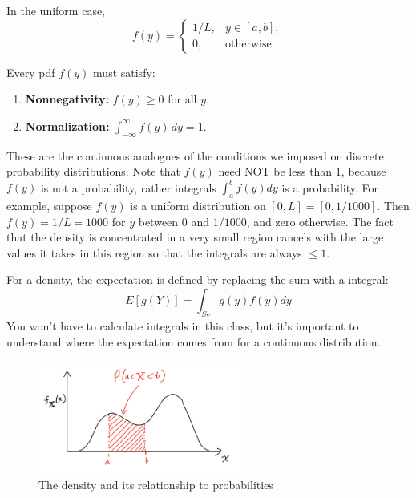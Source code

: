 In the uniform case,  
\[
f(y) = 
\begin{cases}
1/L, & y \in [a,b], \\
0, & \text{otherwise}.
\end{cases}
\]  

Every pdf \(f(y)\) must satisfy:  
\begin{enumerate}
\item \textbf{Nonnegativity:} \(f(y) \ge 0\) for all \(y\).  
\item \textbf{Normalization:} \(\int_{-\infty}^{\infty} f(y)\,dy = 1\).  
\end{enumerate}

These are the continuous analogues of the conditions we imposed on discrete probability distributions.  Note that $f(y)$ need NOT be less than $1$, because $f(y)$ is not a probability, rather integrals $\int_{a}^bf(y)dy$ is a probability. For example, suppose $f(y)$ is a uniform distribution on $[0,L] = [0,1/1000]$. Then $f(y) = 1/L = 1000$ for $y$ between $0$ and $1/1000$, and zero otherwise. The fact that the density is concentrated in a very small region cancels with the large values it takes in this region so that the integrals are always $\le 1$.

For a density, the expectation is defined by replacing the sum with a integral: 
\begin{equation}
E[g(Y)] = \int_{S_Y}g(y)f(y)dy
\end{equation}
You won't have to calculate integrals in this class, but it's important to understand where the expectation comes from for a continuous distribution. 

\begin{figure}[h]
\centering
\includegraphics[width=0.6\textwidth]{./../figures/density}
\caption{The density and its relationship to probabilities}\label{fig:density}
\end{figure}



